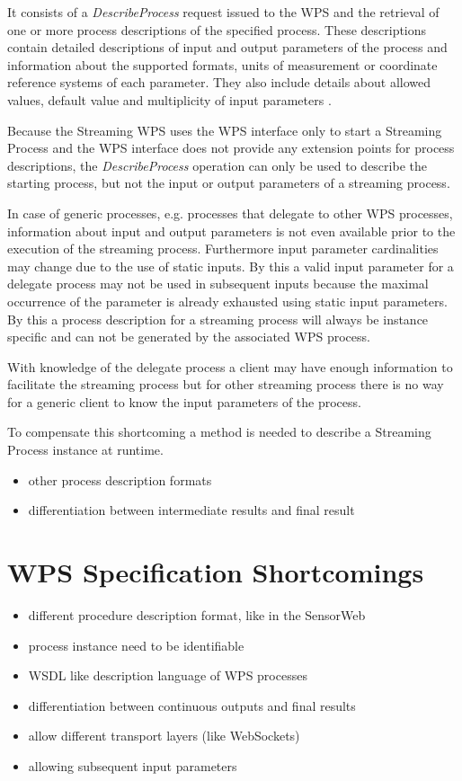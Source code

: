 		It consists of a \emph{DescribeProcess} request issued to the \ac{WPS} and the retrieval of one or more process descriptions of the specified process. These descriptions contain detailed descriptions of input and output parameters of the process and information about the supported formats, units of measurement or coordinate reference systems of each parameter. They also include details about allowed values, default value and multiplicity of input parameters \citep{ogc:wps}.

		Because the Streaming \ac{WPS} uses the \ac{WPS} interface only to start a Streaming Process and the \ac{WPS} interface does not provide any extension points for process descriptions, the \emph{DescribeProcess} operation can only be used to describe the starting process, but not the input or output parameters of a streaming process.

		In case of generic processes, e.g. processes that delegate to other \ac{WPS} processes, information about input and output parameters is not even available prior to the execution of the streaming process. Furthermore input parameter cardinalities may change due to the use of static inputs. By this a valid input parameter for a delegate process may not be used in subsequent inputs because the maximal occurrence of the parameter is already exhausted using static input parameters. By this a process description for a streaming process will always be instance specific and can not be generated by the associated \ac{WPS} process.

		With knowledge of the delegate process a client may have enough information to facilitate the streaming process but for other streaming process there is no way for a generic client to know the input parameters of the process.

		To compensate this shortcoming a method is needed to describe a Streaming Process instance at runtime.
		\begin{itemize}
			\item other process description formats
			\item differentiation between intermediate results and final result
		\end{itemize}
	\section{WPS Specification Shortcomings}
	\begin{itemize}
		\item different procedure description format, like in the SensorWeb
		\item process instance need to be identifiable
		\item WSDL like description language of WPS processes
		\item differentiation between continuous outputs and final results
		\item allow different transport layers (like WebSockets)
		\item allowing subsequent input parameters
	\end{itemize}
